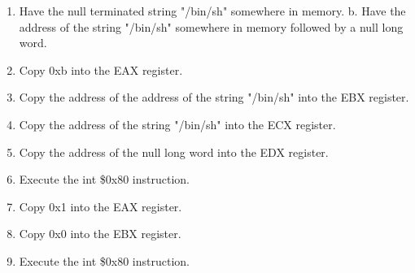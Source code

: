 \documentclass[10pt]{article}
\begin{document}
\begin{enumerate}
\item Have the null terminated string "/bin/sh" somewhere in memory. b. Have the address of the string "/bin/sh" somewhere in memory followed by a null long word. 
\item Copy 0xb into the EAX register. 
\item Copy the address of the address of the string "/bin/sh" into the EBX register. 
\item Copy the address of the string "/bin/sh" into the ECX register. 
\item Copy the address of the null long word into the EDX register. 
\item Execute the int \$0x80 instruction. 
\item Copy 0x1 into the EAX register. 
\item Copy 0x0 into the EBX register. 
\item Execute the int \$0x80 instruction. 
\end{enumerate}
\end{document}
